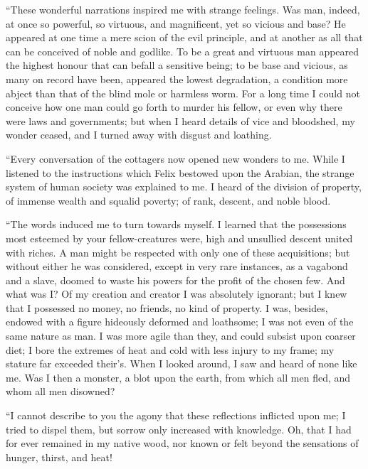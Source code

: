 ``These wonderful narrations inspired
me with strange feelings. Was man, indeed,
at once so powerful, so virtuous,
and magnificent, yet so vicious and
base? He appeared at one time a mere
scion of the evil principle, and at another
as all that can be conceived of noble
and godlike. To be a great and virtuous
man appeared the highest honour
that can befall a sensitive being; to be
base and vicious, as many on record
have been, appeared the lowest degradation,
a condition more abject than
that of the blind mole or harmless
worm. For a long time I could
not conceive how one man could go
forth to murder his fellow, or even
why there were laws and governments;
but when I heard details of vice and
bloodshed, my wonder ceased, and I
turned away with disgust and loathing.

``Every conversation of the cottagers
now op\-ened new wonders to me. While
I listened to the instructions which Felix
bestowed upon the Arabian, the
strange system of human society was
explained to me. I heard of the division
of property, of immense wealth
and squalid poverty; of rank, descent,
and noble blood.

``The words induced me to turn towards
myself. I learned that the possessions
most esteemed by your fellow-creatures
were, high and unsullied descent
united with riches. A man might
be respected with only one of these acquisitions;
but without either he was considered,
except in very rare instances,
as a vagabond and a slave, doomed to
waste his powers for the profit of the
chosen few. And what was I? Of my
creation and creator I was absolutely
ignorant; but I knew that I possessed
no money, no friends, no kind of
property. I was, besides, endowed with a
figure hideously deformed and loathsome;
I was not even of the same nature
as man. I was more agile than
they, and could subsist upon coarser
diet; I bore the extremes of heat and cold
with less injury to my frame; my stature
far exceeded their's. When I
looked around, I saw and heard of none
like me. Was I then a monster, a blot
upon the earth, from which all men fled,
and whom all men disowned?

``I cannot describe to you the agony
that these reflections inflicted upon me;
I tried to dispel them, but sorrow only
increased with knowledge. Oh, that
I had for ever remained in my native
wood, nor known or felt beyond
the sensations of hunger, thirst, and
heat!

